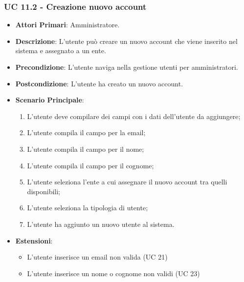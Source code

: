 			\subsubsection{UC 11.2 - Creazione nuovo account}
			\begin{itemize}
				\item \textbf{Attori Primari}: Amministratore.
				\item \textbf{Descrizione}: L'utente può creare un nuovo account che viene inserito nel sistema e assegnato a un ente.
				\item \textbf{Precondizione}: L'utente naviga nella gestione utenti per amministratori.
				\item \textbf{Postcondizione}: L'utente ha creato un nuovo account.
				\item \textbf{Scenario Principale}:
				\begin{enumerate}
					\item{L'utente deve compilare dei campi con i dati dell'utente da aggiungere;}
					\item{L'utente compila il campo per la email;}
					\item{L'utente compila il campo per il nome;}
					\item{L'utente compila il campo per il cognome;}
					\item{L'utente seleziona l'ente a cui assegnare il nuovo account tra quelli disponibili;}
					\item{L'utente seleziona la tipologia di utente;}
					\item{L'utente ha aggiunto un nuovo utente al sistema.}
				\end{enumerate}	
				\item \textbf{Estensioni}:
				\begin{itemize}
					\item L'utente inserisce un email non valida (UC 21)
					\item L'utente inserisce un nome o cognome non validi (UC 23)
				\end{itemize}
			\end{itemize}
			

